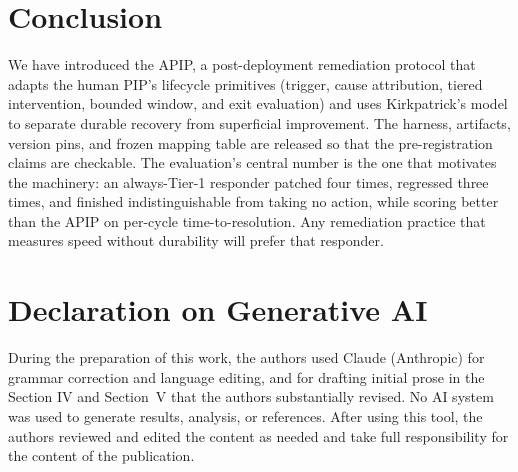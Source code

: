 \documentclass[conference]{IEEEtran}
\begin{document}
\section{Conclusion}

We have introduced the APIP, a post-deployment remediation protocol that adapts
the human PIP's lifecycle primitives (trigger, cause attribution, tiered
intervention, bounded window, and exit evaluation) and uses Kirkpatrick's model
to separate durable recovery from superficial improvement. The harness,
artifacts, version pins, and frozen mapping table are released so that the
pre-registration claims are checkable. The evaluation's central number is the
one that motivates the machinery: an always-Tier-1 responder patched four
times, regressed three times, and finished indistinguishable from taking no
action, while scoring better than the APIP on per-cycle time-to-resolution. Any
remediation practice that measures speed without durability will prefer that
responder.

\section*{Declaration on Generative AI}

During the preparation of this work, the authors used Claude (Anthropic) for
grammar correction and language editing, and for drafting initial prose in the
Section IV and Section~V that the authors substantially revised. No AI
system was used to generate results, analysis, or references. After using this
tool, the authors reviewed and edited the content as needed and take full
responsibility for the content of the publication.
\end{document}
